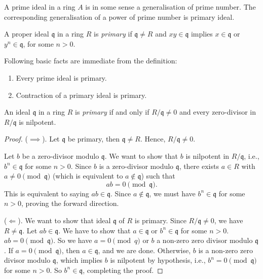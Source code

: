 A prime ideal in a ring \( A \) is in some sense a generalisation of prime number. The corresponding generalisation of a power of prime number is primary ideal. \cite[p.~50~(edited)]{AtiyahMacdonald}

\begin{definition}
    A proper ideal \( \mathfrak{q} \) in a ring \( R \) is  \emph{primary} if \( \mathfrak{q} \neq R \) and  \( xy \in \mathfrak{q}\) implies \( x \in \mathfrak{q} \) or \( y^n \in \mathfrak{q}\), for some \( n > 0 \). 
\end{definition}
Following basic facts are immediate from the definition:
\begin{proposition}
\begin{enumerate}
    \item Every prime ideal is primary.
    \item Contraction of a primary ideal is primary.
\end{enumerate}
\end{proposition}
\begin{proposition}
    An ideal \( \mathfrak{q} \)  in a ring \( R \) is  \emph{primary} if and only if \( R / \mathfrak{q} \neq 0 \) and every zero-divisor in \( R / \mathfrak{q} \) is nilpotent.
\end{proposition}
\begin{proof}
    (\( \implies \)). Let \( \mathfrak{q} \) be primary, then \( \mathfrak{q} \neq R \). Hence,  \( R / \mathfrak{q} \neq 0 \). 

    Let \( b \) be a zero-divisor modulo \( \mathfrak{q} \). We want to show that \( b \) is nilpotent in  \( R / \mathfrak{q} \), i.e., \( b^n \in \mathfrak{q} \) for some \( n > 0 \). Since \( b \) is a zero-divisor modulo  \( \mathfrak{q} \), there exists \( a \in R \) with  \( a \neq 0 \pmod{\mathfrak{q}} \) (which is equivalent to \( a \not\in \mathfrak{q} \)) such that 
    \[
        ab = 0 \pmod{\mathfrak{q}}.
    \]
     This is equivalent to saying \( ab \in \mathfrak{q} \). Since \( a \not\in \mathfrak{q} \), we must have \( b^n \in \mathfrak{q} \) for some \( n > 0 \), proving the forward direction.

    (\( \Longleftarrow \)). We want to show that ideal \( \mathfrak{q} \) of \( R \) is primary. Since \( R / \mathfrak{q} \neq 0\), we have \( R \neq \mathfrak{q} \). Let \( ab \in \mathfrak{q} \). We have to show that \( a \in \mathfrak{q} \) or \( b^n \in \mathfrak{q} \) for some \( n > 0 \). \( ab = 0 \pmod{\mathfrak{q}} \). So we have \( a = 0 \pmod{q}\) or \( b \) a non-zero zero divisor modulo  \( \mathfrak{q} \). If \( a = 0 \pmod{\mathfrak{q}} \), then \( a \in \mathfrak{q} \), and we are done. Otherwise, \( b \) is a non-zero zero divisor modulo  \( \mathfrak{q} \), which implies \( b \) is nilpotent by hypothesis, i.e.,  \( b^n = 0 \pmod{\mathfrak{q}} \) for some \( n > 0 \). So \( b^n \in \mathfrak{q} \), completing the proof.
\end{proof}

